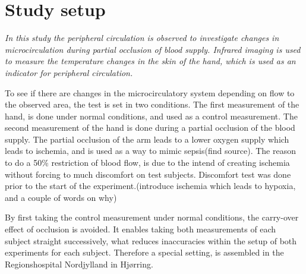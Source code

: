 \chapter{Study setup}

\textit{In this study the peripheral circulation is observed to investigate changes in microcirculation during partial occlusion of blood supply. Infrared imaging is used to measure the temperature changes in the skin of the hand, which is used as an indicator for peripheral circulation.} 


To see if there are changes in the microcirculatory system depending on flow to the observed area, the test is set in two conditions. The first measurement of the hand, is done under normal conditions, and used as a control measurement. The second measurement of the hand is done during a partial occlusion of the blood supply. The partial occlusion of the arm leads to a lower oxygen supply which leads to ischemia, and is used as a way to mimic sepsis\fxnote(find source). The reason to do a 50\% restriction of blood flow, is due to the intend of creating ischemia without forcing to much discomfort on test subjects. Discomfort test was done prior to the start of the experiment.\fxnote(introduce ischemia which leads to hypoxia, and a couple of words on why)

By first taking the control measurement under normal conditions, the carry-over effect of occlusion is avoided. It enables taking both measurements of each subject straight successively, what reduces inaccuracies within the setup of both experiments for each subject. Therefore a special setting, is assembled in the Regionshospital Nordjylland in Hj\o{}rring.